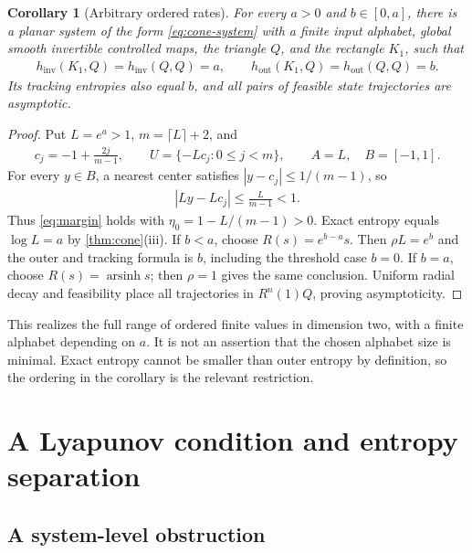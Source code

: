 \documentclass[11pt,a4paper]{article}
\newtheorem{corollary}[theorem]{Corollary}
\theoremstyle{definition}
\theoremstyle{remark}
\begin{document}
\begin{corollary}[Arbitrary ordered rates]\label{cor:rates}
For every \(a>0\) and \(b\in[0,a]\), there is a planar system of the form \eqref{eq:cone-system} with a finite input alphabet, global smooth invertible controlled maps, the triangle \(Q\), and the rectangle \(K_1\), such that
\begin{align*}
 h_{\mathrm{inv}}(K_1,Q)=h_{\mathrm{inv}}(Q,Q)=a,\qquad
 h_{\mathrm{out}}(K_1,Q)=h_{\mathrm{out}}(Q,Q)=b.
\end{align*}
Its tracking entropies also equal \(b\), and all pairs of feasible state trajectories are asymptotic.
\end{corollary}
\begin{proof}
Put \(L=e^a>1\), \(m=\lceil L\rceil+2\), and
\begin{align*}
 c_j=-1+\frac{2j}{m-1},\qquad
 U=\{-Lc_j:0\leq j<m\},\qquad A=L,\quad B=[-1,1].
\end{align*}
For every \(y\in B\), a nearest center satisfies \(|y-c_j|\leq1/(m-1)\), so
\begin{align*}
 |Ly-Lc_j|\leq\frac L{m-1}<1.
\end{align*}
Thus \eqref{eq:margin} holds with \(\eta_0=1-L/(m-1)>0\). Exact entropy equals \(\log L=a\) by \cref{thm:cone}(iii). If \(b<a\), choose \(R(s)=e^{b-a}s\). Then \(\rho L=e^b\) and the outer and tracking formula is \(b\), including the threshold case \(b=0\). If \(b=a\), choose \(R(s)=\operatorname{arsinh}s\); then \(\rho=1\) gives the same conclusion. Uniform radial decay and feasibility place all trajectories in \(R^n(1)Q\), proving asymptoticity.
\end{proof}

This realizes the full range of ordered finite values in dimension two, with a finite alphabet depending on \(a\). It is not an assertion that the chosen alphabet size is minimal. Exact entropy cannot be smaller than outer entropy by definition, so the ordering in the corollary is the relevant restriction.

\section{A Lyapunov condition and entropy separation}\label{sec:separation}

\subsection{A system-level obstruction}
\end{document}
